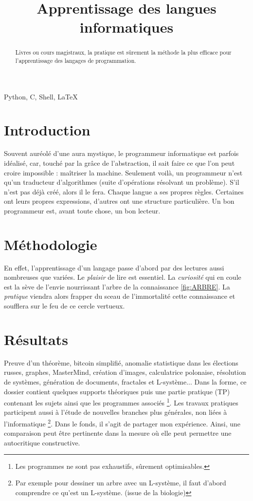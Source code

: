 \documentclass[conference]{IEEEtran}
\title{Apprentissage des langues informatiques}
\author{
    \IEEEauthorblockN{Pigassou Mathis\IEEEauthorrefmark{1}} 
    \IEEEauthorblockA{UFR Informatique, Université Toulouse Capitole, France\\
    Email: mathis.pigassou@ut-capitole.fr}
}
\begin{document}
\maketitle  

\begin{abstract}  
Livres ou cours magistraux, la pratique est sûrement la méthode la plus efficace pour l'apprentissage des langages de programmation.
\end{abstract}
\begin{IEEEkeywords} 
Python, C, Shell, LaTeX 
\end{IEEEkeywords}


\section{Introduction} 
Souvent auréolé d'une aura mystique, le programmeur informatique est parfois idéalisé, car, touché par la grâce de l'abstraction, il sait faire ce que l'on peut croire impossible : maîtriser la machine. \newline
Seulement voilà, un programmeur n'est qu'un traducteur d'algorithmes (suite d'opérations résolvant un problème). S'il n'est pas déjà créé, alors il le fera. \newline
Chaque langue a ses propres règles. Certaines ont leurs propres expressions, d'autres ont une structure particulière. Un bon programmeur est, avant toute chose, un bon lecteur. 

 
\section{Méthodologie}
En effet, l'apprentissage d'un langage passe d'abord par des lectures aussi nombreuses que variées. Le \emph{plaisir} de lire est essentiel. La \emph{curiosité} qui en coule est la sève de l'envie nourrissant l'arbre de la connaissance \ref{fig:ARBRE}. La \emph{pratique} viendra alors frapper du sceau de l'immortalité cette connaissance et soufflera sur le feu de ce cercle vertueux.   

\section{Résultats}
Preuve d'un théorème, bitcoin simplifié, anomalie statistique dans les élections russes, graphes, MasterMind, création d'images, calculatrice polonaise, résolution de systèmes, génération de documents, fractales et L-système... \newline 
Dans la forme, ce dossier contient quelques supports théoriques puis une partie pratique (TP) contenant les sujets ainsi que les programmes associés \footnote{Les programmes ne sont pas exhaustifs, sûrement optimisables.}. Les travaux pratiques participent aussi à l'étude de nouvelles branches plus générales, non liées à l'informatique \footnote{Par exemple pour dessiner un arbre avec un L-système, il faut d'abord comprendre ce qu'est un L-système. (issue de la biologie)}. \newline 
Dans le fonds, il s'agit de partager mon expérience. Ainsi, une comparaison peut être pertinente dans la mesure où elle peut permettre une autocritique constructive.
\end{document}
